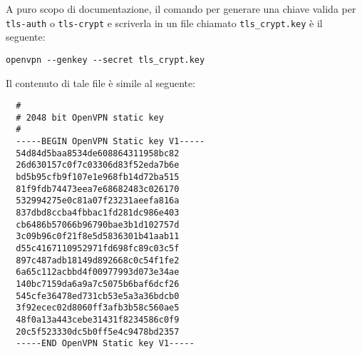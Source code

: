 A puro scopo di documentazione, il comando per generare una chiave valida per
\texttt{tls-auth} o \texttt{tls-crypt} e scriverla in un file chiamato \texttt{tls\_crypt.key}
è il seguente:
\begin{verbatim}
openvpn --genkey --secret tls_crypt.key
\end{verbatim}
Il contenuto di tale file è simile al seguente:
\begin{verbatim}
  #
  # 2048 bit OpenVPN static key
  #
  -----BEGIN OpenVPN Static key V1-----
  54d84d5baa8534de608864311958bc82
  26d630157c0f7c03306d83f52eda7b6e
  bd5b95cfb9f107e1e968fb14d72ba515
  81f9fdb74473eea7e68682483c026170
  532994275e0c81a07f23231aeefa816a
  837dbd8ccba4fbbac1fd281dc986e403
  cb6486b57066b96790bae3b1d102757d
  3c09b96c0f21f8e5d5836301b41aab11
  d55c4167110952971fd698fc89c03c5f
  897c487adb18149d892668c0c54f1fe2
  6a65c112acbbd4f00977993d073e34ae
  140bc7159da6a9a7c5075b6baf6dcf26
  545cfe36478ed731cb53e5a3a36bdcb0
  3f92ecec02d8060ff3afb3b58c560ae5
  48f0a13a443cebe31431f8234586c0f9
  20c5f523330dc5b0ff5e4c9478bd2357
  -----END OpenVPN Static key V1-----
\end{verbatim}


